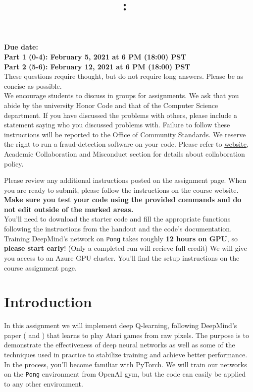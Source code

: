 \documentclass{article}
\title{
\vspace{-1in}
\textmd{\textbf{\hmwkClass:\ \hmwkTitle}}}
\author{}
\date{} %
\begin{document}
\maketitle
\vspace{-.5in}
\begin{framed}
{\bf Due date: \\
Part 1 (0-4): February 5, 2021 at 6 PM (18:00) PST\\
Part 2 (5-6): February 12, 2021 at 6 PM (18:00) PST}
\\[1em]
These questions require thought, but do not require long answers. Please be as concise as possible.
\\[1em]
We encourage students to discuss in groups for assignments. We ask
that you abide by the university Honor Code and that of the Computer Science department. If you have discussed the problems with others,
please include a statement saying who you discussed problems with. Failure to follow these instructions
will be reported to the Office of Community Standards. We reserve the right to run a fraud-detection software on your code. Please refer to \href{http://web.stanford.edu/class/cs234/index.html}{website}, Academic Collaboration and Misconduct section for details about collaboration policy.


Please review any additional instructions posted on the assignment page. When you are ready to submit, please
follow the instructions on the course website. \textbf{Make sure you test your code using the
provided commands and do not edit outside of the marked areas.}
\\[1em]
You'll need to download the starter code and fill the appropriate functions following the instructions from the handout and the code's documentation. Training DeepMind's network on \texttt{Pong} takes roughly \textbf{12 hours on GPU}, so \textbf{please start early}! (Only a completed run will recieve full credit) We will give you access to an Azure GPU cluster. You'll find the setup instructions on the course assignment page.
\end{framed}
\section*{Introduction}

In this assignment we will implement deep Q-learning, following DeepMind's paper (\cite{mnih2015human} and \cite{mnih-atari-2013}) that learns to play Atari games from raw pixels. The purpose is to demonstrate the effectiveness of deep neural networks as well as some of the techniques used in practice to stabilize training and achieve better performance. In the process, you'll become familiar with PyTorch. We will train our networks on the \texttt{Pong} environment from OpenAI gym, but the code can easily be applied to any other environment. \\
\end{document}
